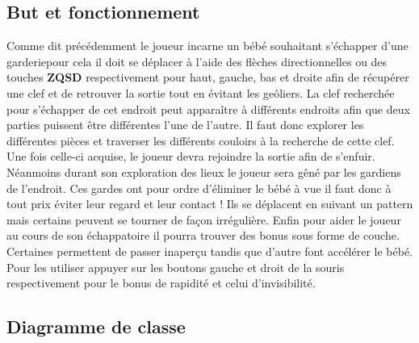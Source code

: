 \documentclass{article}
\begin{document}
\subsection{But et fonctionnement}
Comme dit précédemment le joueur incarne un bébé souhaitant s'échapper d'une \og garderie\fg pour cela il doit se déplacer à l'aide des flèches directionnelles ou des touches \textbf{ZQSD} respectivement pour haut, gauche, bas et droite afin de récupérer une clef et de retrouver la sortie tout en évitant les geôliers.\bigbreak
La clef recherchée pour s'échapper de cet endroit peut apparaître à différents endroits afin que deux parties puissent être différentes l'une de l'autre. Il faut donc explorer les différentes pièces et traverser les différents couloirs à la recherche de cette clef. Une fois celle-ci acquise, le joueur devra rejoindre la sortie afin de s'enfuir.\bigbreak
Néanmoins durant son exploration des lieux le joueur sera gêné par les gardiens de l'endroit. Ces gardes ont pour ordre d'éliminer le bébé à vue il faut donc à tout prix éviter leur regard et leur contact ! Ils se déplacent en suivant un pattern mais certains peuvent se tourner de façon irrégulière.\bigbreak
Enfin pour aider le joueur au cours de son échappatoire il pourra trouver des bonus sous forme de couche. Certaines permettent de passer inaperçu tandis que d'autre font accélérer le bébé. Pour les utiliser appuyer sur les boutons gauche et droit de la souris respectivement pour le bonus de rapidité et celui d'invisibilité.\bigbreak

\subsection{Diagramme de classe}
\end{document}
